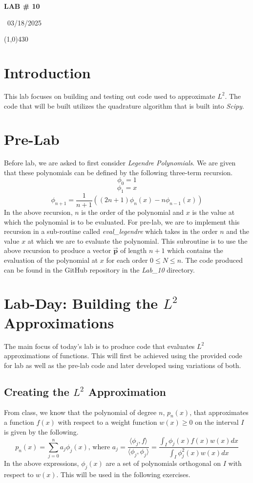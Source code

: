\documentclass{article}
\begin{document}
\begin{center}
 \LARGE\bfseries LAB \# 10
\end{center}
\begin{center}
    ~03/18/2025~
\end{center}
 \line(1,0){430}

\section{Introduction}
This lab focuses on building and testing out code used to approximate \(L^2\). The code that will be built utilizes the quadrature algorithm that is built into \textit{Scipy}.

\section{Pre-Lab}
Before lab, we are asked to first consider \textit{Legendre Polynomials}. We are given that these polynomials can be defined by the following three-term recursion.
\[
\phi_0 = 1
\]
\[
\phi_1 = x
\]
\[
\phi_{n+1} = \frac{1}{n+1}((2n+1)\phi_n(x) - n\phi_{n-1}(x))
\]
In the above recursion, \(n\) is the order of the polynomial and \(x\) is the value at which the polynomial is to be evaluated.
For pre-lab, we are to implement this recursion in a sub-routine called \textit{eval\_legendre} which takes in the order \(n\) and the value \(x\) at which we are to evaluate the polynomial. This subroutine is to use the above recursion to produce a vector \(\mathbf{\Vec{p}}\) of length \(n+1\) which contains the evaluation of the polynomial at \(x\) for each order \(0 \leq N \leq n\). The code produced can be found in the GitHub repository in the \textit{Lab\_10} directory.

\section{Lab-Day: Building the \(L^2\) Approximations}
The main focus of today's lab is to produce code that evaluates \(L^2\) approximations of functions. This will first be achieved using the provided code for lab as well as the pre-lab code and later developed using variations of both.

\subsection{Creating the \(L^2\) Approximation}
From class, we know that the polynomial of degree \(n\), \(p_n(x)\), that approximates a function \(f(x)\) with respect to a weight function \(w(x)\geq0\) on the interval \(I\) is given by the following.
\[
p_n(x) = \sum_{j=0}^n a_j \phi_j(x) \mbox{, where } a_j = \frac{\langle \phi_j, f \rangle}{\langle \phi_j, \phi_j \rangle} = \frac{\int_I \phi_j(x)f(x)w(x)dx}{\int_I \phi_j^2(x)w(x)dx}
\]
In the above expressions, \(\phi_j(x)\) are a set of polynomials orthogonal on \(I\) with respect to \(w(x)\). This will be used in the following exercises.
\end{document}

